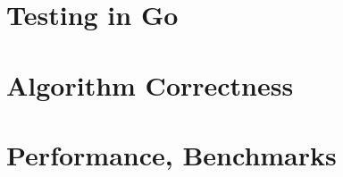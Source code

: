 \section{Testing in Go}\label{sec:testing-in-go}


\section{Algorithm Correctness}\label{sec:correctness}


\section{Performance, Benchmarks}\label{sec:benchmarks}
